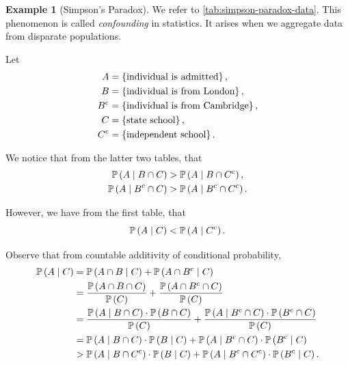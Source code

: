\documentclass{article}
\theoremstyle{definition}
\newtheorem{example}[theorem]{Example}
\theoremstyle{remark}
\newcommand{\Prob}{\mathbb{P}}
\newcommand{\Conditional}[2]{#1\mid #2}
\newcommand{\compl}{^{\mathrm{c}}}
\begin{document}
\begin{example}[Simpson's Paradox]
    \label{ex:simpson-paradox}%
    We refer to \autoref{tab:simpson-paradox-data}. This phenomenon is called \emph{confounding} in statistics. It arises when we aggregate data from disparate populations.

    Let
    \begin{align*}
        A &= \Bqty{\text{individual is admitted}}, \\
        B &= \Bqty{\text{individual is from London}}, \\
        B\compl &= \Bqty{\text{individual is from Cambridge}}, \\
        C &= \Bqty{\text{state school}}, \\
        C\compl &= \Bqty{\text{independent school}}.
    \end{align*}

    We notice that from the latter two tables, that
    \begin{align*}
        \Prob\pqty{\Conditional{A}{B \cap C}} &> \Prob\pqty{\Conditional{A}{B \cap C \compl}}, \\
        \Prob\pqty{\Conditional{A}{B\compl \cap C}} &> \Prob\pqty{\Conditional{A}{B\compl \cap C \compl}}.
    \end{align*}

    However, we have from the first table, that
    \[
        \Prob\pqty{\Conditional{A}{C}} < \Prob\pqty{\Conditional{A}{C\compl}}.
    \]

    Observe that from countable additivity of conditional probability,
    \begin{align*}
        \Prob\pqty{\Conditional{A}{C}} &= \Prob\pqty{\Conditional{A \cap B}{C}} + \Prob\pqty{\Conditional{A \cap B\compl}{C}} \\
        &= \frac{\Prob\pqty{A \cap B \cap C}}{\Prob\pqty{C}} + \frac{\Prob\pqty{A \cap B\compl \cap C}}{\Prob\pqty{C}} \\
        &= \frac{\Prob\pqty{\Conditional{A}{B \cap C}} \cdot \Prob\pqty{B \cap C}}{\Prob\pqty{C}} + \frac{\Prob\pqty{\Conditional{A}{B \compl \cap C}} \cdot \Prob\pqty{B\compl \cap C}}{\Prob\pqty{C}} \\
        &= \Prob\pqty{\Conditional{A}{B \cap C}} \cdot \Prob\pqty{\Conditional{B}{C}} + \Prob\pqty{\Conditional{A}{B\compl \cap C}} \cdot \Prob\pqty{\Conditional{B \compl}{C}} \\
        &> \Prob\pqty{\Conditional{A}{B \cap C\compl}} \cdot \Prob\pqty{\Conditional{B}{C}} + \Prob\pqty{\Conditional{A}{B\compl \cap C\compl}} \cdot \Prob \pqty{\Conditional{B\compl}{C}}.
    \end{align*}


\end{example}
\end{document}

